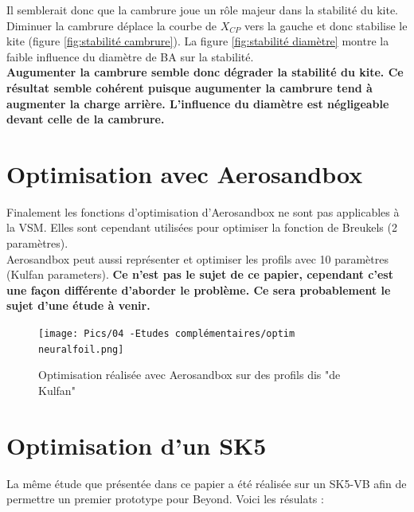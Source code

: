 Il semblerait donc que la cambrure joue un rôle majeur dans la stabilité du kite. Diminuer la cambrure déplace la courbe de $X_{CP}$ vers la gauche et donc stabilise le kite (figure \ref{fig:stabilité cambrure}). La figure \ref{fig:stabilité diamètre} montre la faible influence du diamètre de BA sur la stabilité. \\
\textbf{ Augumenter la cambrure semble donc dégrader la stabilité du kite. Ce résultat semble cohérent puisque augumenter la cambrure tend à augmenter la charge arrière. L'influence du diamètre est négligeable devant celle de la cambrure. }



\section{Optimisation avec Aerosandbox}
\label{sec:Ch4.3}

Finalement les fonctions d'optimisation d'Aerosandbox ne sont pas applicables à la VSM. Elles sont cependant utilisées pour optimiser la fonction de Breukels (2 paramètres). \\
Aerosandbox peut aussi représenter et optimiser les profils avec 10 paramètres (Kulfan parameters). \textbf{Ce n'est pas le sujet de ce papier, cependant c'est une façon différente d'aborder le problème. Ce sera probablement le sujet d'une étude à venir.}

\begin{figure}[H]
    \centering
    \texttt{[image: Pics/04 -Etudes complémentaires/optim neuralfoil.png]}  
    \caption{Optimisation réalisée avec Aerosandbox sur des profils dis "de Kulfan"}
    \label{fig:kulfan}
\end{figure}


\section{Optimisation d'un SK5}
\label{sec:Ch4.4}

La même étude que présentée dans ce papier a été réalisée sur un SK5-VB afin de permettre un premier prototype pour Beyond. Voici les résulats :\\